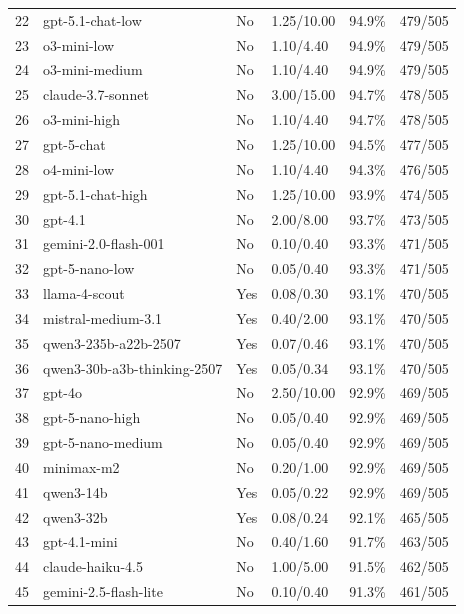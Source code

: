 \documentclass[11pt]{article}
\begin{document}
\begin{table}[htbp]
\begin{tabular}{rlllrr}
    22 & gpt-5.1-chat-low & No & 1.25/10.00 & 94.9\% & 479/505 \\
    23 & o3-mini-low & No & 1.10/4.40 & 94.9\% & 479/505 \\
    24 & o3-mini-medium & No & 1.10/4.40 & 94.9\% & 479/505 \\
    25 & claude-3.7-sonnet & No & 3.00/15.00 & 94.7\% & 478/505 \\
    26 & o3-mini-high & No & 1.10/4.40 & 94.7\% & 478/505 \\
    27 & gpt-5-chat & No & 1.25/10.00 & 94.5\% & 477/505 \\
    28 & o4-mini-low & No & 1.10/4.40 & 94.3\% & 476/505 \\
    29 & gpt-5.1-chat-high & No & 1.25/10.00 & 93.9\% & 474/505 \\
    30 & gpt-4.1 & No & 2.00/8.00 & 93.7\% & 473/505 \\
    31 & gemini-2.0-flash-001 & No & 0.10/0.40 & 93.3\% & 471/505 \\
    32 & gpt-5-nano-low & No & 0.05/0.40 & 93.3\% & 471/505 \\
    33 & llama-4-scout & \textcolor{openweight}{Yes} & 0.08/0.30 & 93.1\% & 470/505 \\
    34 & mistral-medium-3.1 & \textcolor{openweight}{Yes} & 0.40/2.00 & 93.1\% & 470/505 \\
    35 & qwen3-235b-a22b-2507 & \textcolor{openweight}{Yes} & 0.07/0.46 & 93.1\% & 470/505 \\
    36 & qwen3-30b-a3b-thinking-2507 & \textcolor{openweight}{Yes} & 0.05/0.34 & 93.1\% & 470/505 \\
    37 & gpt-4o & No & 2.50/10.00 & 92.9\% & 469/505 \\
    38 & gpt-5-nano-high & No & 0.05/0.40 & 92.9\% & 469/505 \\
    39 & gpt-5-nano-medium & No & 0.05/0.40 & 92.9\% & 469/505 \\
    40 & minimax-m2 & No & 0.20/1.00 & 92.9\% & 469/505 \\
    41 & qwen3-14b & \textcolor{openweight}{Yes} & 0.05/0.22 & 92.9\% & 469/505 \\
    42 & qwen3-32b & \textcolor{openweight}{Yes} & 0.08/0.24 & 92.1\% & 465/505 \\
    43 & gpt-4.1-mini & No & 0.40/1.60 & 91.7\% & 463/505 \\
    44 & claude-haiku-4.5 & No & 1.00/5.00 & 91.5\% & 462/505 \\
    45 & gemini-2.5-flash-lite & No & 0.10/0.40 & 91.3\% & 461/505 \\

\end{tabular}
\end{table}
\end{document}
